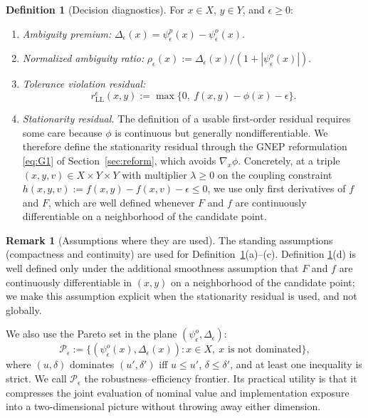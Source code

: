 \documentclass[11pt]{article}
\theoremstyle{definition}
\newtheorem{definition}[theorem]{Definition}
\newtheorem{remark}[theorem]{Remark}
\newcommand{\eps}{\epsilon}
\begin{document}
\begin{definition}[Decision diagnostics]\label{def:diagnostics}
For $x\in X$, $y\in Y$, and $\eps\ge 0$:
\begin{enumerate}[leftmargin=*,nosep]
\item \emph{Ambiguity premium:}
$\Delta_\eps(x)=\psi_\eps^p(x)-\psi_\eps^o(x)$.
\item \emph{Normalized ambiguity ratio:}
$\rho_\eps(x):=\Delta_\eps(x)/(1+|\psi_\eps^o(x)|)$.
\item \emph{Tolerance violation residual:}
\begin{equation}\label{eq:rLL}
  r_\mathrm{LL}^\eps(x,y):=\max\{0,\ f(x,y)-\phi(x)-\eps\}.
\end{equation}
\item \emph{Stationarity residual.} The definition of a usable
first-order residual requires some care because $\phi$ is
continuous but generally nondifferentiable. We therefore define
the stationarity residual through the GNEP reformulation
\eqref{eq:G1} of Section~\ref{sec:reform}, which avoids
$\nabla_x\phi$. Concretely, at a triple $(x,y,v)\in X\times Y\times Y$
with multiplier $\lambda\ge 0$ on the coupling constraint
$h(x,y,v):=f(x,y)-f(x,v)-\eps\le 0$, we use only first derivatives
of $f$ and $F$, which are well defined whenever $F$ and $f$ are
continuously differentiable on a neighborhood of the candidate
point. 
\end{enumerate}
\end{definition}

\begin{remark}[Assumptions where they are used]\label{rem:assum-map}
The standing assumptions (compactness and continuity) are used for
Definition~\ref{def:diagnostics}(a)--(c). Definition
\ref{def:diagnostics}(d) is well defined only under the additional
smoothness assumption that $F$ and $f$ are continuously
differentiable in $(x,y)$ on a neighborhood of the candidate
point; we make this assumption explicit when the stationarity
residual is used, and not globally.
\end{remark}

We also use the Pareto set in the plane
$(\psi_\eps^o,\Delta_\eps)$:
\begin{equation}\label{eq:pareto}
  \mathcal P_\eps
  :=\bigl\{(\psi_\eps^o(x),\Delta_\eps(x)):x\in X,\ x\text{ is not dominated}\bigr\},
\end{equation}
where $(u,\delta)$ dominates $(u',\delta')$ iff $u\le u'$,
$\delta\le\delta'$, and at least one inequality is strict. We call
$\mathcal P_\eps$ the robustness--efficiency frontier. Its
practical utility is that it compresses the joint evaluation of
nominal value and implementation exposure into a two-dimensional
picture without throwing away either dimension.
\end{document}
